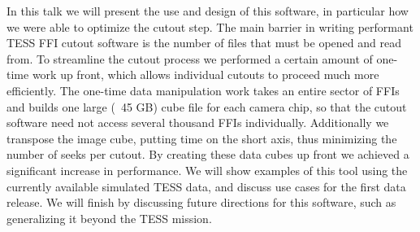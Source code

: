 \documentclass{report}
\begin{document}
In this talk we will present the use and design of this software, in particular how we were able to optimize the cutout step. The main barrier in writing performant TESS FFI cutout software is the number of files that must be opened and read from. To streamline the cutout process we performed a certain amount of one-time work up front, which allows individual cutouts to proceed much more efficiently. The one-time data manipulation work takes an entire sector of FFIs and builds one large (~45 GB) cube file for each camera chip, so that the cutout software need not access several thousand FFIs individually.  Additionally we transpose the image cube, putting time on the short axis, thus minimizing the number of seeks per cutout. By creating these data cubes up front we achieved a significant increase in performance. We will show examples of this tool using the currently available simulated TESS data, and discuss use cases for the first data release. We will finish by discussing future directions for this software, such as generalizing it beyond the TESS mission.\newline
\newpage
\end{document}
